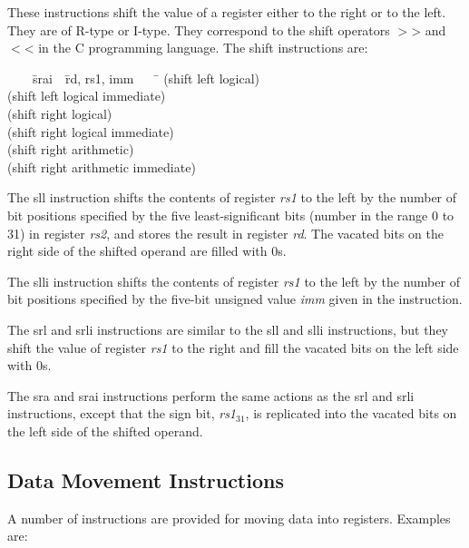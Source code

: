 \documentclass[11pt, twoside, pdftex]{article}
\newenvironment{ctabbing}%
{\begin{center}\begin{minipage}{\textwidth}\begin{tabbing}}
{\end{tabbing}\end{minipage}\end{center}}
\begin{document}
These instructions shift the value of a register either to the right or to the left.
They are of R-type or I-type. They correspond to the shift operators $>$> and $<$< in the C 
programming language.  The shift instructions are:
\vspace{-\baselineskip}
\begin{ctabbing}
~~~~\={\sf srai}~~\={\sf rd, rs1, imm}~~~~\=\kill
{}  \>(shift left logical)\\
  \>(shift left logical immediate)\\
  \>(shift right logical)\\
  \>(shift right logical immediate)\\
  \>(shift right arithmetic)\\
  \>(shift right arithmetic immediate)
\end{ctabbing}

\noindent
The {\sf sll} instruction shifts the contents of register {\it rs1} to the left by the number 
of bit positions specified by the five least-significant bits (number in the range 0 to 31)
in register {\it rs2}, and stores the result in register {\it rd}. The vacated bits on the
right side of the shifted operand are filled with 0s.

\noindent
The {\sf slli} instruction shifts the contents of register {\it rs1} to the left by the number 
of bit positions specified by the five-bit unsigned value {\it imm} given in the instruction.

\noindent
The {\sf srl} and {\sf srli} instructions are similar to the {\sf sll} and {\sf slli}
instructions, but they shift the value of register {\it rs1} to the right and fill the vacated
bits on the left side with 0s.

\noindent
The {\sf sra} and {\sf srai} instructions perform the same actions as the {\sf srl} and 
{\sf srli} instructions, except that the sign bit, {\it rs1}$_{31}$, is replicated into 
the vacated bits on the left side of the shifted operand.

\subsection{Data Movement Instructions}

A number of instructions are provided for moving data into registers. Examples are:
\end{document}
